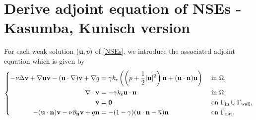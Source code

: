 \documentclass[oneside,11pt]{book}
\numberwithin{equation}{section}
\begin{document}
\section{Derive adjoint equation of NSEs - Kasumba, Kunisch version}
For each weak solution $({\bf u},p)$ of \eqref{NSEs}, we introduce the associated adjoint equation which is given by
\begin{equation}
    \left\{\begin{split}
        -\nu\Delta{\bf v} + \nabla{\bf u}{\bf v} - ({\bf u}\cdot\nabla){\bf v} + \nabla q &= \gamma k_\epsilon\left(\left(p + \frac{1}{2}|{\bf u}|^2\right){\bf n} + ({\bf u}\cdot{\bf n}){\bf u}\right) &&\mbox{ in } \Omega,\\
        \nabla\cdot{\bf v} &= -\gamma k_\epsilon{\bf u}\cdot{\bf n} &&\mbox{ in } \Omega,\\
        {\bf v} &= {\bf 0} &&\mbox{ on } \Gamma_{\rm in}\cup\Gamma_{\rm wall},\\
        -({\bf u}\cdot{\bf n}){\bf v} - \nu\partial_{\bf n}{\bf v} + q{\bf n} &= -(1 - \gamma)({\bf u}\cdot{\bf n} - \overline{u}){\bf n} &&\mbox{ on } \Gamma_{\rm out}.
    \end{split}\right.
\end{equation}
\end{document}
